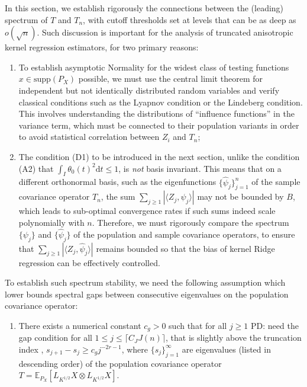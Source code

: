 \documentclass[aos]{imsart}
\renewcommand{\hat}{\widehat}
\newcommand{\supp}{\mathrm{supp}}
\newcommand{\ud}{\mathrm d}
\newcommand{\pd}[1]{%
	{ \color{blue} PD: #1}%
}
\theoremstyle{plain}
\theoremstyle{definition}
\theoremstyle{definition}
\begin{document}
In this section, we establish rigorously the connections between the (leading) spectrum of $T$ and $T_n$,
with cutoff thresholds set at levels that can be as deep as $o(\sqrt{n})$. Such discussion is important for the analysis of truncated anisotropic kernel regression estimators, for two primary reasons:
\begin{enumerate}
\item To establish asymptotic Normality for the widest class of testing functions $x\in\supp(P_X)$ possible, we must use the central limit theorem for independent but not identically distributed random variables
and verify classical conditions such as the Lyapnov condition or the Lindeberg condition. This involves understanding the distributions of ``influence functions'' in the variance term, which must be connected to
their population variants in order to avoid statistical correlation between $Z_i$ and $T_n$;
\item The condition (D1) to be introduced in the next section, unlike the condition (A2) that $\int_I \theta_0(t)^2\ud t\leq 1$, is \emph{not} basis invariant. This means that on a different orthonormal basis,
such as the eigenfunctions $\{\hat\psi_j\}_{j=1}^n$ of the sample covariance operator $T_n$, the sum $\sum_{j\geq 1}|\langle Z_j,\hat\psi_j\rangle|$ may not be bounded by $B$,
which leads to sub-optimal convergence rates if such sums indeed scale polynomially with $n$.
Therefore, we must rigorously compare the spectrum $\{\psi_j\}$ and $\{\hat\psi_j\}$ of the population and sample covariance operators,
to ensure that $\sum_{j\geq 1}|\langle Z_j,\hat\psi_j\rangle|$ remains bounded so that the bias of kernel Ridge regression can be effectively controlled.
\end{enumerate}

To establish such spectrum stability, we need the following assumption which lower bounds spectral gaps between consecutive eigenvalues on the population covariance operator:
\begin{enumerate}
\item[(C1)] There exists a numerical constant $c_g>0$ such that for all $j\geq 1$ \pd{need the gap condition for all $1 \leq j \leq \lceil C_J J(n) \rceil$, that is slightly above the truncation index}, $s_{j+1}-s_j\geq c_g j^{-2r-1}$, where $\{s_j\}_{j=1}^{\infty}$ are eigenvalues (listed in descending order) of the population covariance operator $T=\mathbb E_{P_X}[L_{K^{1/2}}X\otimes L_{K^{1/2}}X]$.
\end{enumerate}
\end{document}
